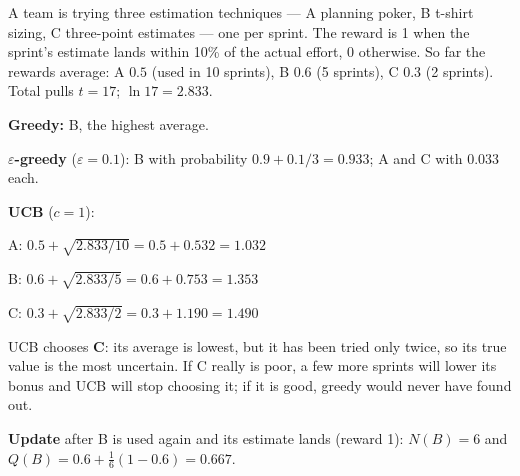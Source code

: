 \begin{worked}
A team is trying three estimation techniques --- A planning poker, B t-shirt sizing,
C three-point estimates --- one per sprint. The reward is 1 when the sprint's
estimate lands within 10\% of the actual effort, 0 otherwise. So far the rewards
average: A $0.5$ (used in 10 sprints), B $0.6$ (5 sprints), C $0.3$ (2 sprints).
Total pulls $t = 17$; $\ln 17 = 2.833$.

\smallskip
\textbf{Greedy:} B, the highest average.

\textbf{$\varepsilon$-greedy} ($\varepsilon = 0.1$): B with probability
$0.9 + 0.1/3 = 0.933$; A and C with $0.033$ each.

\textbf{UCB} ($c = 1$):
\begin{tight}
  \item A: $0.5 + \sqrt{2.833/10} = 0.5 + 0.532 = 1.032$
  \item B: $0.6 + \sqrt{2.833/5} = 0.6 + 0.753 = 1.353$
  \item C: $0.3 + \sqrt{2.833/2} = 0.3 + 1.190 = \mathbf{1.490}$
\end{tight}
UCB chooses \textbf{C}: its average is lowest, but it has been tried only twice, so
its true value is the most uncertain. If C really is poor, a few more sprints will
lower its bonus and UCB will stop choosing it; if it is good, greedy would never have
found out.

\smallskip
\textbf{Update} after B is used again and its estimate lands (reward 1): $N(B) = 6$
and $Q(B) = 0.6 + \tfrac{1}{6}(1 - 0.6) = 0.667$.
\end{worked}

